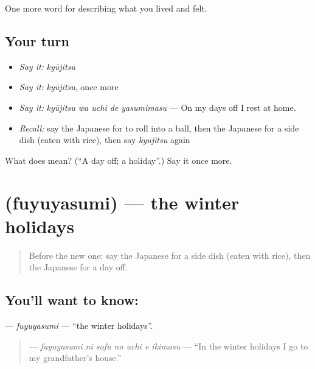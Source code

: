 \begin{grammarlens}[title={What you've built}]
One more word for describing what you lived and felt.
\end{grammarlens}

\subsection*{Your turn}
\begin{itemize}
\raggedright
  \item \emph{Say it:} \emph{kyūjitsu}
  \item \emph{Say it:} \emph{kyūjitsu}, once more
  \item \emph{Say it:} \emph{kyūjitsu wa uchi de yasumimasu} — On my days off I rest at home.
  \item \emph{Recall:} say the Japanese for to roll into a ball, then the Japanese for a side dish (eaten with rice), then say \emph{kyūjitsu} again
\end{itemize}

\begin{tcolorbox}[breakable,colback=teal!4,colframe=teal!35!black,title={Before you move on}]
What does  mean? (\textquotedblleft{}A day off; a holiday\textquotedblright{}.) Say it once more.
\end{tcolorbox}
\section[\texorpdfstring{\ja{ふゆやすみ} (fuyuyasumi)}{ふゆやすみ (fuyuyasumi)}]{ (fuyuyasumi) — the winter holidays}

\label{lesson:JA-C498-fuyuyasumi}



\begin{quote}
Before the new one: say the Japanese for a side dish (eaten with rice), then the Japanese for a day off.
\end{quote}

\subsection*{You'll want to know: }
\textbf{} — \emph{fuyuyasumi} — \textquotedblleft{}the winter holidays\textquotedblright{}.

\begin{quote}
\textbf{   } — \emph{fuyuyasumi ni sofu no uchi e ikimasu} — \textquotedblleft{}In the winter holidays I go to my grandfather's house.\textquotedblright{}
\end{quote}

